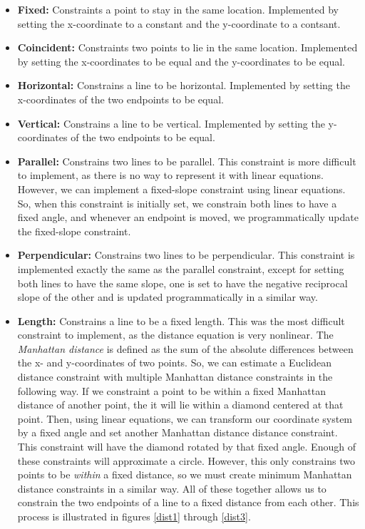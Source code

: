 \begin{itemize}
\item {\bf Fixed:} Constraints a point to stay in the same location. Implemented by setting the x-coordinate to a constant and the y-coordinate to a contsant.
\item {\bf Coincident:} Constraints two points to lie in the same location. Implemented by setting the x-coordinates to be equal and the y-coordinates to be equal.
\item {\bf Horizontal:} Constrains a line to be horizontal. Implemented by setting the x-coordinates of the two endpoints to be equal.
\item {\bf Vertical:} Constrains a line to be vertical. Implemented by setting the y-coordinates of the two endpoints to be equal.
\item {\bf Parallel:} Constrains two lines to be parallel. This constraint is more difficult to implement, as there is no way to represent it with linear equations. However, we can implement a fixed-slope constraint using linear equations. So, when this constraint is initially set, we constrain both lines to have a fixed angle, and whenever an endpoint is moved, we programmatically update the fixed-slope constraint.
\item {\bf Perpendicular:} Constrains two lines to be perpendicular. This constraint is implemented exactly the same as the parallel constraint, except for setting both lines to have the same slope, one is set to have the negative reciprocal slope of the other and is updated programmatically in a similar way.
\item {\bf Length:} Constrains a line to be a fixed length. This was the most difficult constraint to implement, as the distance equation is very nonlinear. The {\it Manhattan distance} is defined as the sum of the absolute differences between the x- and y-coordinates of two points. So, we can estimate a Euclidean distance constraint with multiple Manhattan distance constraints in the following way. If we constraint a point to be within a fixed Manhattan distance of another point, the it will lie within a diamond centered at that point. Then, using linear equations, we can transform our coordinate system by a fixed angle and set another Manhattan distance distance constraint. This constraint will have the diamond rotated by that fixed angle. Enough of these constraints will approximate a circle. However, this only constrains two points to be {\it within} a fixed distance, so we must create minimum Manhattan distance constraints in a similar way. All of these together allows us to constrain the two endpoints of a line to a fixed distance from each other. This process is illustrated in figures \ref{dist1} through \ref{dist3}.
\end{itemize}


